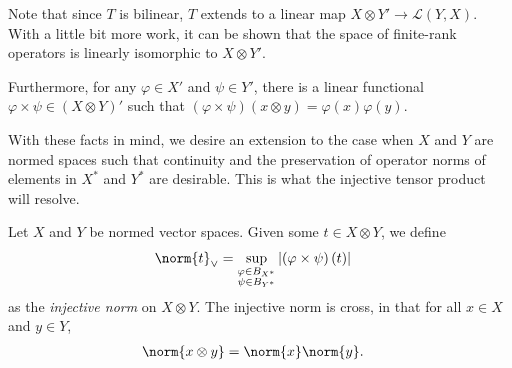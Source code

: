 Note that since $T$ is bilinear, $T$ extends to a linear map $X\otimes Y' \rightarrow \mathcal{L}\left( Y,X \right)$. With a little bit more work, it can be shown that the space of finite-rank operators is linearly isomorphic to $X\otimes Y'$.\newline

Furthermore, for any $\varphi\in X'$ and $\psi\in Y'$, there is a linear functional $\varphi\times \psi\in \left( X\otimes Y \right)'$ such that $\left( \varphi\times \psi \right)\left( x\otimes y \right) = \varphi(x)\varphi(y)$.\newline

With these facts in mind, we desire an extension to the case when $X$ and $Y$ are normed spaces such that continuity and the preservation of operator norms of elements in $X^{\ast}$ and $Y^{\ast}$ are desirable. This is what the injective tensor product will resolve.
\begin{proposition}
  Let $X$ and $Y$ be normed vector spaces. Given some $t\in X\otimes Y$, we define
  \begin{align*}
    \norm{t}_{\vee} &= \sup_{\substack{\varphi\in B_{X^{\ast}}\\\psi\in B_{Y^{\ast}}}} \left\vert \left( \varphi\times \psi \right)\left( t \right) \right\vert
  \end{align*}
  as the \textit{injective norm} on $X\otimes Y$. The injective norm is cross, in that for all $x\in X$ and $y\in Y$,
  \begin{align*}
    \norm{x\otimes y} &= \norm{x}\norm{y}.
  \end{align*}
\end{proposition}
